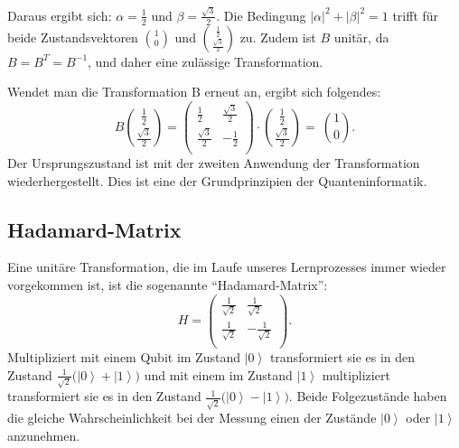 Daraus ergibt sich: $\alpha=\frac{1}{2}$ und $\beta=\frac{\sqrt3}{2}$. Die Bedingung $\left|\alpha\right|^2+\left|\beta\right|^2=1$ trifft für beide Zustandsvektoren $\binom{1}{0}$ und $\binom{\frac{1}{2}}{\frac{\sqrt3}{2}}$ zu. Zudem ist $B$ unitär, da $B=B^T= B^{-1}$, und daher eine zulässige Transformation.

Wendet man die Transformation B erneut an, ergibt sich folgendes:
\begin{equation}
    B\binom{\frac{1}{2}}{\frac{\sqrt3}{2}}=\left(\begin{matrix}\frac{1}{2}&\frac{\sqrt3}{2}\\\frac{\sqrt3}{2}&-\frac{1}{2}\\\end{matrix}\right)\cdot\binom{\frac{1}{2}}{\frac{\sqrt3}{2}}=\ \binom{1}{0}.
\end{equation}
Der Ursprungszustand ist mit der zweiten Anwendung der Transformation wiederhergestellt. Dies ist eine der Grundprinzipien der Quanteninformatik.

\subsection{Hadamard-Matrix}

Eine unitäre Transformation, die im Laufe unseres Lernprozesses immer wieder vorgekommen ist, ist die sogenannte ``Hadamard-Matrix'': 
\begin{equation}
    H=\left(\begin{matrix}\frac{1}{\sqrt2}&\frac{1}{\sqrt2}\\\frac{1}{\sqrt2}&-\frac{1}{\sqrt2}\\\end{matrix}\right).
\end{equation} Multipliziert mit einem Qubit im Zustand $\left|0\right\rangle$ transformiert sie es in den Zustand $\frac{1}{\sqrt2}(\left|\left.0\right\rangle+\right.\left|\left.1\right\rangle)\right.$ und mit einem im Zustand $\left|1\right\rangle$ multipliziert transformiert sie es in den Zustand $\frac{1}{\sqrt2}(\left|\left.0\right\rangle-\right.\left|\left.1\right\rangle)\right.$. Beide Folgezustände haben die gleiche Wahrscheinlichkeit bei der Messung einen der Zustände $\left|0\right\rangle$ oder $\left|1\right\rangle$ anzunehmen. \\

